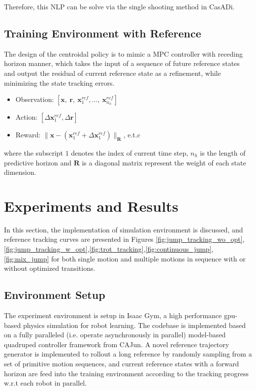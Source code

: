 \documentclass[11pt, conference]{IEEEtran}
\theoremstyle{definition} %
\begin{document}
Therefore, this NLP can be solve via the single shooting method in CasADi\cite{andersson2019casadi}.


\subsection{Training Environment with Reference}

The design of the centroidal policy is to mimic a MPC controller with receding horizon manner, which takes the input of a sequence of future reference states and output the residual of current reference state as a refinement, while minimizing the state tracking errors.

\begin{itemize}
    \item {Observation}: $[\mathbf{x},\ \mathbf{r},\ \mathbf{x}_{1}^{ref}, \dots,\ \mathbf{x}_{n_h}^{ref}]$
    \item {Action}: $[\Delta\mathbf{x}_{1}^{ref}, \Delta\mathbf{r}]$
    \item {Reward}: $\|\mathbf{x} - (\mathbf{x}_{1}^{ref} + \Delta\mathbf{x}_{1}^{ref})\|_{\mathbf{R}}$, e.t.c
\end{itemize}
where the subscript $1$ denotes the index of current time step, $n_h$ is the length of predictive horizon and $\mathbf{R}$ is a diagonal matrix represent the weight of each state dimension.

\section{Experiments and Results}

In this section, the implementation of simulation environment is discussed, and reference tracking curves are presented in Figures \ref{fig:jump_tracking_wo_opt},\ref{fig:jump_tracking_w_opt},\ref{fig:trot_tracking},\ref{fig:continuous_jump},\ref{fig:mix_jump} for both single motion and multiple motions in sequence with or without optimized transitions.

\subsection{Environment Setup}

The experiment environment is setup in Isaac Gym\cite{makoviychuk2021isaac}, a high performance gpu-based physics simulation for robot learning. The codebase is implemented based on a fully paralleled (i.e. operate asynchronously in parallel) model-based quadruped controller framework from CAJun\cite{yang2023cajun}. A novel reference trajectory generator is implemented to rollout a long reference by randomly sampling from a set of primitive motion sequences, and current reference states with a forward horizon are feed into the training environment according to the tracking progress w.r.t each robot in parallel.
\end{document}
